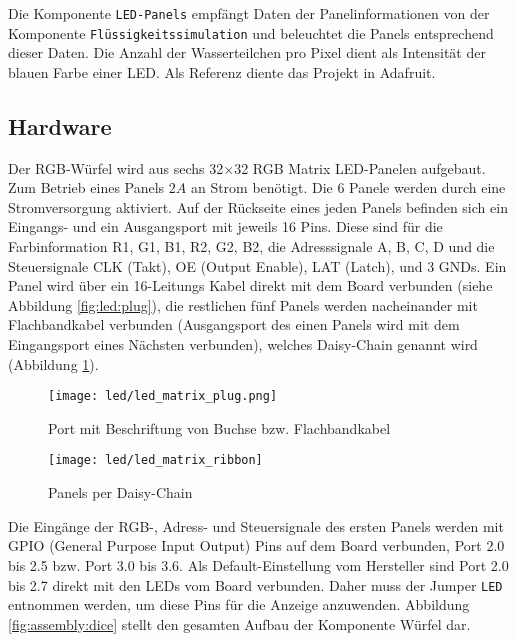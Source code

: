 Die Komponente \texttt{LED-Panels} empfängt Daten der Panelinformationen von der Komponente \texttt{Flüssigkeitssimulation} und beleuchtet die Panels entsprechend dieser Daten. Die Anzahl der Wasserteilchen pro Pixel dient als Intensität der blauen Farbe einer LED. Als Referenz diente das Projekt \cite{rgbLedMatrix} in Adafruit.

\subsection{Hardware}
Der RGB-Würfel wird aus sechs 32$\times$32 RGB Matrix LED-Panelen aufgebaut. Zum Betrieb eines Panels $2A$ an Strom benötigt. Die 6 Panele werden durch eine Stromversorgung aktiviert. Auf der Rückseite eines jeden Panels befinden sich ein Eingangs- und ein Ausgangsport mit jeweils 16 Pins. Diese sind für die Farbinformation R1, G1, B1, R2, G2, B2, die Adresssignale A, B, C, D und die Steuersignale CLK (Takt), OE (Output Enable), LAT (Latch), und 3 GNDs. Ein Panel wird über ein 16-Leitungs Kabel direkt mit dem Board verbunden (siehe Abbildung \ref{fig:led:plug}), die restlichen fünf Panels werden nacheinander mit Flachbandkabel verbunden (Ausgangsport des einen Panels wird mit dem Eingangsport eines Nächsten verbunden), welches Daisy-Chain genannt wird (Abbildung \ref{fig:led:chain}). 

\begin{figure}[h!]
	\centering
	\begin{minipage}[t]{0.45\linewidth}
	\texttt{[image: led/led\_matrix\_plug.png]}
	\caption{Port mit Beschriftung von Buchse bzw. Flachbandkabel}
	\label{fig:led:plug}
	\end{minipage}
	\hspace{0.05\linewidth}
	\begin{minipage}[t]{0.45\linewidth}
	\texttt{[image: led/led\_matrix\_ribbon]}
	\caption{Panels per Daisy-Chain}
	\label{fig:led:chain}
	\end{minipage}
\end{figure}

Die Eingänge der RGB-, Adress- und Steuersignale des ersten Panels werden mit GPIO (General Purpose Input Output) Pins auf dem Board verbunden, Port 2.0 bis 2.5 bzw. Port 3.0 bis 3.6. Als Default-Einstellung vom Hersteller sind Port 2.0 bis 2.7 direkt mit den LEDs vom Board verbunden. Daher muss der Jumper \texttt{LED} entnommen werden, um diese Pins für die Anzeige anzuwenden. Abbildung \ref{fig:assembly:dice} stellt den gesamten Aufbau der Komponente Würfel dar.

